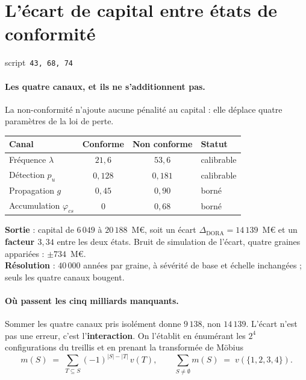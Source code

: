 \documentclass[11pt,a4paper]{article}
\newcommand{\src}[1]{\hfill{\footnotesize\textsf{script~\texttt{#1}}}}
\begin{document}
\section{L'écart de capital entre états de conformité}
\src{\texttt{43}, \texttt{68}, \texttt{74}}

\paragraph{Les quatre canaux, et ils ne s'additionnent pas.} La non-conformité n'ajoute aucune
pénalité au capital : elle déplace quatre paramètres de la loi de perte.

\begin{center}\footnotesize
\renewcommand{\arraystretch}{1.15}
\begin{tabular}{@{}l c c l@{}}
\toprule
\textbf{Canal} & \textbf{Conforme} & \textbf{Non conforme} & \textbf{Statut} \\
\midrule
Fréquence $\lambda$ & $21{,}6$ & $53{,}6$ & calibrable \\
Détection $p_u$ & $0{,}128$ & $0{,}181$ & calibrable \\
Propagation $g$ & $0{,}45$ & $0{,}90$ & borné \\
Accumulation $\varphi_{cs}$ & $0$ & $0{,}68$ & borné \\
\bottomrule
\end{tabular}
\end{center}

\begin{res}
\textbf{Sortie} : capital de $6\,049$ à $20\,188$~M\euro, soit un écart
$\Delta_{\text{DORA}} = 14\,139$~M\euro{} et un \textbf{facteur $3{,}34$} entre les deux états.
Bruit de simulation de l'écart, quatre graines appariées : $\pm 734$~M\euro.\\
\textbf{Résolution} : $40\,000$ années par graine, à sévérité de base et échelle inchangées ;
seuls les quatre canaux bougent.
\end{res}

\paragraph{Où passent les cinq milliards manquants.} Sommer les quatre canaux pris isolément
donne $9\,138$, non $14\,139$. L'écart n'est pas une erreur, c'est l'\textbf{interaction}. On
l'établit en énumérant les $2^4$ configurations du treillis et en prenant la transformée de
Möbius
\begin{equation}
m(S) \;=\; \sum_{T \subseteq S} (-1)^{|S| - |T|}\, v(T),
\qquad \sum_{S \neq \emptyset} m(S) \;=\; v(\{1,2,3,4\}).
\end{equation}
\end{document}
